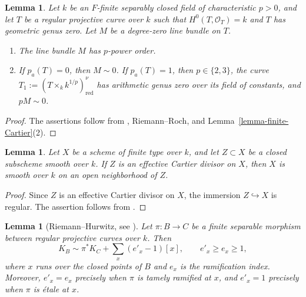 \documentclass[10pt,abstract=true]{scrartcl}
\numberwithin{equation}{section}
\newtheorem{lemma}[theorem]{Lemma}
\theoremstyle{definition}
\theoremstyle{remark}
\begin{document}
\begin{lemma}\label{lemm:geometric-genus-zero-torsion}
  Let $k$ be an $F$-finite separably closed field of characteristic $p>0$, and let $T$ be a regular projective curve over $k$ such that $H^0(T,\mathcal O_T)=k$ and $T$ has geometric genus zero.
  Let $M$ be a degree-zero line bundle on $T$.
  \begin{enumerate}[label=\textup{(\arabic*)}]
    \item The line bundle $M$ has $p$-power order.
    \item If $p_a(T)=0$, then $M\sim0$.
      If $p_a(T)=1$, then $p\in\{2,3\}$, the curve $T_1:=(T\times_k k^{1/p})_{\mathrm{red}}^\nu$ has arithmetic genus zero over its field of constants, and $pM\sim0$.
  \end{enumerate}
\end{lemma}
\begin{proof}
  The assertions follow from \cite[Remark~5.2 and the proof of Theorem~11.8]{tanaka_invariants_2021}, Riemann--Roch, and Lemma~\ref{lemma-finite-Cartier}\textup{(2)}.
\end{proof}

\begin{lemma}\label{lemma-smooth-Cartier-divisor}
  Let $X$ be a scheme of finite type over $k$, and let $Z\subset X$ be a closed subscheme smooth over $k$.
  If $Z$ is an effective Cartier divisor on $X$, then $X$ is smooth over $k$ on an open neighborhood of $Z$.
\end{lemma}
\begin{proof}
  Since $Z$ is an effective Cartier divisor on $X$, the immersion $Z\hookrightarrow X$ is regular.
  The assertion follows from \cite[Expos\'e~II, Corollary~4.16]{SGA1}.
\end{proof}

\begin{lemma}[Riemann--Hurwitz, see {\cite[Theorem~7.4.16]{Liu-AGAC}}]\label{lemma-canonical-curve-comparison}%
  Let $\pi\colon B\to C$ be a finite \emph{separable} morphism between regular projective curves over $k$.
  Then
  \[
    K_B\sim\pi^*K_C+\sum_x(e'_x-1)[x],
    \qquad e'_x\geq e_x\geq1,
  \]
  where $x$ runs over the closed points of $B$ and $e_x$ is the ramification index.
  Moreover, $e'_x=e_x$ precisely when $\pi$ is tamely ramified at $x$, and $e'_x=1$ precisely when $\pi$ is \'etale at $x$.
\end{lemma}
\end{document}
